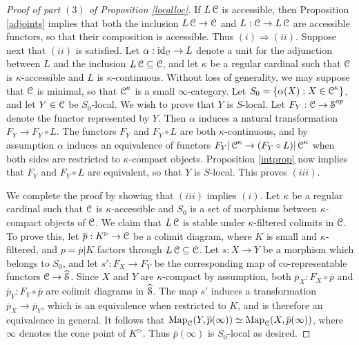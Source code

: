 \begin{proof}[Proof of part $(3)$ of Proposition \ref{localloc}]
If $L \operatorname{\mathcal{C}}$ is accessible, then Proposition \ref{adjoints} implies that both the inclusion $L \operatorname{\mathcal{C}} \rightarrow \operatorname{\mathcal{C}}$ and $L: \operatorname{\mathcal{C}} \rightarrow L \operatorname{\mathcal{C}}$ are accessible functors, so that their composition is accessible. Thus $(i) \Rightarrow (ii)$. Suppose next that $(ii)$ is satisfied.
Let $\alpha: \operatorname{id}_{\operatorname{\mathcal{C}}} \rightarrow L$ denote a unit for the adjunction between $L$ and
the inclusion $L \operatorname{\mathcal{C}} \subseteq \operatorname{\mathcal{C}}$, and let $\kappa$ be a regular cardinal such that
$\operatorname{\mathcal{C}}$ is $\kappa$-accessible and $L$ is $\kappa$-continuous. Without loss of generality,
we may suppose that $\operatorname{\mathcal{C}}$ is minimal, so that $\operatorname{\mathcal{C}}^{\kappa}$ is a small $\infty$-category.
Let $S_0 = \{ \alpha(X): X \in \operatorname{\mathcal{C}}^{\kappa} \}$, and let
$Y \in \operatorname{\mathcal{C}}$ be $S_0$-local. We wish to prove that $Y$ is $S$-local. Let 
$F_Y: \operatorname{\mathcal{C}} \rightarrow \operatorname{\mathcal{S}}^{op}$ denote the functor represented by $Y$.
Then $\alpha$ induces a natural transformation $F_Y \rightarrow F_Y \circ L$. The functors $F_Y$ and $F_Y \circ L$ are both $\kappa$-continuous, and by assumption $\alpha$ induces
an equivalence of functors $F_Y | \operatorname{\mathcal{C}}^{\kappa} \rightarrow (F_Y \circ L)| \operatorname{\mathcal{C}}^{\kappa}$ when both sides are restricted to $\kappa$-compact objects. Proposition \ref{intprop} now implies that
$F_Y$ and $F_Y \circ L$ are equivalent, so that $Y$ is $S$-local. This proves $(iii)$.

We complete the proof by showing that $(iii)$ implies $(i)$. Let $\kappa$ be a regular cardinal such that $\operatorname{\mathcal{C}}$ is $\kappa$-accessible and $S_0$ is a set of morphisms between $\kappa$-compact objects of $\operatorname{\mathcal{C}}$. We claim that $L \operatorname{\mathcal{C}}$ is stable under $\kappa$-filtered colimits
in $\operatorname{\mathcal{C}}$. To prove this, let $\overline{p}: K^{\triangleright} \rightarrow \operatorname{\mathcal{C}}$ be a colimit diagram, where $K$ is small and $\kappa$-filtered, and $p = \overline{p}|K$ factors through
$L\operatorname{\mathcal{C}} \subseteq \operatorname{\mathcal{C}}$. Let $s: X \rightarrow Y$ be a morphism which belongs to $S_0$, and let
$s': F_X \rightarrow F_Y$ be the corresponding map of co-representable functors
$\operatorname{\mathcal{C}} \rightarrow \widehat{\operatorname{\mathcal{S}}}$. Since $X$ and $Y$ are $\kappa$-compact by assumption, both
$\overline{p}_{X}: F_X \circ \overline{p}$ and $\overline{p}_Y: F_Y \circ \overline{p}$ are colimit diagrams in $\widehat{\operatorname{\mathcal{S}}}$. The map $s'$ induces a transformation
$\overline{p}_{X} \rightarrow \overline{p}_{Y}$, which is an equivalence when restricted to
$K$, and is therefore an equivalence in general. It follows that
$\operatorname{{Map}}_{\operatorname{\mathcal{C}}}(Y, \overline{p}(\infty)) \simeq \operatorname{{Map}}_{\operatorname{\mathcal{C}}}(X, \overline{p}(\infty))$, where
$\infty$ denotes the cone point of $K^{\triangleright}$. Thus $\overline{p}(\infty)$
is $S_0$-local as desired.


\end{proof}
